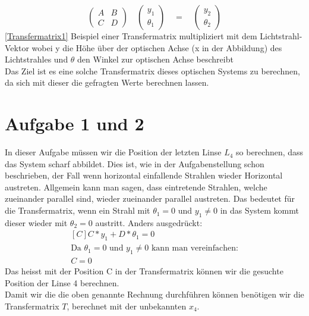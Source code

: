 \documentclass[11pt,twoside,a4paper]{article}
\begin{document}
	\begin{equation} \label{Transfermatrix1}
	\begin{pmatrix}
	A & B \\
	C & D
	\end{pmatrix}
	\quad
	\begin{pmatrix}
	y_{1}\\
	\theta_{1}
	\end{pmatrix}
	\quad
	=
	\quad
	\begin{pmatrix}
	y_{2}\\
	\theta_{2}
	\end{pmatrix}
	\end{equation}
	\ref{Transfermatrix1} Beispiel einer Transfermatrix multipliziert mit dem Lichtstrahl-Vektor wobei y die Höhe über der optischen Achse (x in der Abbildung) des Lichtstrahles und \(\theta\) den Winkel zur optischen Achse beschreibt \\
	
	Das Ziel ist es eine solche Transfermatrix dieses optischen Systems zu berechnen, da sich mit dieser die gefragten Werte berechnen lassen. 
	\section{Aufgabe 1 und 2}
	In dieser Aufgabe müssen wir die Position der letzten Linse \(L_{4}\) so berechnen, dass das System scharf abbildet. Dies ist, wie in der Aufgabenstellung schon beschrieben, der Fall wenn horizontal einfallende Strahlen wieder Horizontal austreten. Allgemein kann man sagen, dass eintretende Strahlen, welche zueinander parallel sind, wieder zueinander parallel austreten.
	Das bedeutet für die Transfermatrix, wenn ein Strahl mit \(\theta_{1} = 0\) und \(y_{1} \neq 0\) in das System kommt dieser wieder mit \(\theta_{2} = 0\) austritt. Anders ausgedrückt: 
	\begin{equation} \label{scharfAbb}
	\begin{aligned}[C]
		C * y_{1} + D * \theta_{1} = 0 \nonumber \\
		\textrm{Da \(\theta_{1} = 0\) und \(y_{1} \neq 0\) kann man vereinfachen:} \nonumber\\
		C = 0
	\end{aligned}
	\end{equation}
	Das heisst mit der Position C in der Transfermatrix können wir die gesuchte Position der Linse 4 berechnen. \\
	Damit wir die die oben genannte Rechnung durchführen können benötigen wir die Transfermatrix \(T\), berechnet mit der unbekannten \(x_{4}\).  
\end{document}
